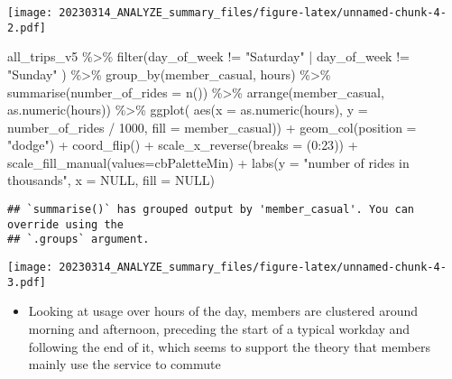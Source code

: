 \documentclass[
]{article}
\newenvironment{Shaded}{\begin{snugshade}}{\end{snugshade}}
\newcommand{\AttributeTok}[1]{\textcolor[rgb]{0.77,0.63,0.00}{#1}}
\newcommand{\ConstantTok}[1]{\textcolor[rgb]{0.00,0.00,0.00}{#1}}
\newcommand{\DecValTok}[1]{\textcolor[rgb]{0.00,0.00,0.81}{#1}}
\newcommand{\FunctionTok}[1]{\textcolor[rgb]{0.00,0.00,0.00}{#1}}
\newcommand{\NormalTok}[1]{#1}
\newcommand{\SpecialCharTok}[1]{\textcolor[rgb]{0.00,0.00,0.00}{#1}}
\newcommand{\StringTok}[1]{\textcolor[rgb]{0.31,0.60,0.02}{#1}}
\providecommand{\tightlist}{%
  \setlength{\itemsep}{0pt}\setlength{\parskip}{0pt}}
\begin{document}
\texttt{[image: 20230314\_ANALYZE\_summary\_files/figure-latex/unnamed-chunk-4-2.pdf]}

\begin{Shaded}
\begin{Highlighting}[]
\NormalTok{all\_trips\_v5 }\SpecialCharTok{\%\textgreater{}\%} 
  \FunctionTok{filter}\NormalTok{(day\_of\_week }\SpecialCharTok{!=} \StringTok{"Saturday"} \SpecialCharTok{|}\NormalTok{ day\_of\_week }\SpecialCharTok{!=} \StringTok{"Sunday"}\NormalTok{ ) }\SpecialCharTok{\%\textgreater{}\%}
  \FunctionTok{group\_by}\NormalTok{(member\_casual, hours) }\SpecialCharTok{\%\textgreater{}\%} 
  \FunctionTok{summarise}\NormalTok{(}\AttributeTok{number\_of\_rides =} \FunctionTok{n}\NormalTok{()) }\SpecialCharTok{\%\textgreater{}\%} 
  \FunctionTok{arrange}\NormalTok{(member\_casual, }\FunctionTok{as.numeric}\NormalTok{(hours))  }\SpecialCharTok{\%\textgreater{}\%} 
  \FunctionTok{ggplot}\NormalTok{( }\FunctionTok{aes}\NormalTok{(}\AttributeTok{x =} \FunctionTok{as.numeric}\NormalTok{(hours), }\AttributeTok{y =}\NormalTok{ number\_of\_rides }\SpecialCharTok{/} \DecValTok{1000}\NormalTok{, }\AttributeTok{fill =}\NormalTok{ member\_casual)) }\SpecialCharTok{+}
  \FunctionTok{geom\_col}\NormalTok{(}\AttributeTok{position =} \StringTok{"dodge"}\NormalTok{) }\SpecialCharTok{+} 
  \FunctionTok{coord\_flip}\NormalTok{()  }\SpecialCharTok{+}
  \FunctionTok{scale\_x\_reverse}\NormalTok{(}\AttributeTok{breaks =}\NormalTok{ (}\DecValTok{0}\SpecialCharTok{:}\DecValTok{23}\NormalTok{)) }\SpecialCharTok{+}
  \FunctionTok{scale\_fill\_manual}\NormalTok{(}\AttributeTok{values=}\NormalTok{cbPaletteMin) }\SpecialCharTok{+}
  \FunctionTok{labs}\NormalTok{(}\AttributeTok{y =} \StringTok{"number of rides in thousands"}\NormalTok{, }\AttributeTok{x =} \ConstantTok{NULL}\NormalTok{, }\AttributeTok{fill =} \ConstantTok{NULL}\NormalTok{)}
\end{Highlighting}
\end{Shaded}

\begin{verbatim}
## `summarise()` has grouped output by 'member_casual'. You can override using the
## `.groups` argument.
\end{verbatim}

\texttt{[image: 20230314\_ANALYZE\_summary\_files/figure-latex/unnamed-chunk-4-3.pdf]}
\fontsize{10}{12} \selectfont

\begin{itemize}
\tightlist
\item
  Looking at usage over hours of the day, members are clustered around
  morning and afternoon, preceding the start of a typical workday and
  following the end of it, which seems to support the theory that
  members mainly use the service to commute
\end{itemize}
\end{document}
